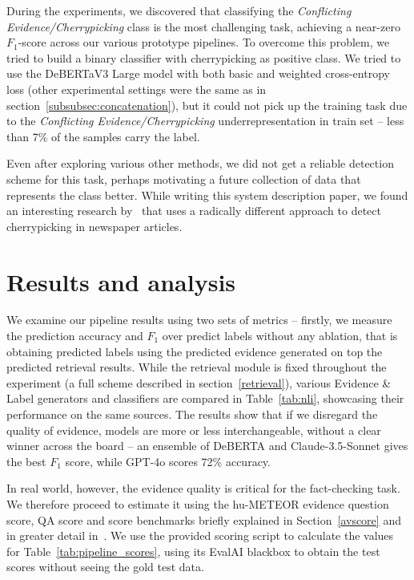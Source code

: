 During the experiments, we discovered that classifying the \textit{Conflicting Evidence/Cherrypicking} class is the most challenging task, achieving a near-zero $F_1$-score across our various prototype pipelines.
To overcome this problem, we tried to build a binary classifier with cherrypicking as positive class. We tried to use the DeBERTaV3 Large model with both basic and weighted cross-entropy loss (other experimental settings were the same as in section~\ref{subsubsec:concatenation}), but it could not pick up the training task due to the \textit{Conflicting Evidence/Cherrypicking} underrepresentation in train set -- less than 7\% of the samples carry the label. 

Even after exploring various other methods, we did not get a reliable detection scheme for this task, perhaps motivating a future collection of data that represents the class better.
While writing this system description paper, we found an interesting research by~\cite{jaradat2024contextawaredetectioncherrypickingnews} that uses a radically different approach to detect cherrypicking in newspaper articles.


\section{Results and analysis}
\label{sec:results}

We examine our pipeline results using two sets of metrics -- firstly, we measure the prediction accuracy and $F_1$ over predict labels without any ablation, that is obtaining predicted labels using the predicted evidence generated on top the predicted retrieval results. 
While the retrieval module is fixed throughout the experiment (a full scheme described in section~\ref{retrieval}), various Evidence \& Label generators and classifiers are compared in Table~\ref{tab:nli}, showcasing their performance on the same sources.
The results show that if we disregard the quality of evidence, models are more or less interchangeable, without a clear winner across the board -- an ensemble of DeBERTA and Claude-3.5-Sonnet gives the best $F_1$ score, while GPT-4o scores 72\% accuracy.
\begin{table}\end{table}
\begin{table}\end{table}

In real world, however, the evidence quality is critical for the fact-checking task.
We therefore proceed to estimate it using the hu-METEOR evidence question score, QA score and \averitec{} score benchmarks briefly explained in Section~\ref{avscore} and in greater detail in~\cite{averitec2024}.
We use the provided \averitec{} scoring script to calculate the values for Table~\ref{tab:pipeline_scores}, using its EvalAI blackbox to obtain the test scores without seeing the gold test data.

